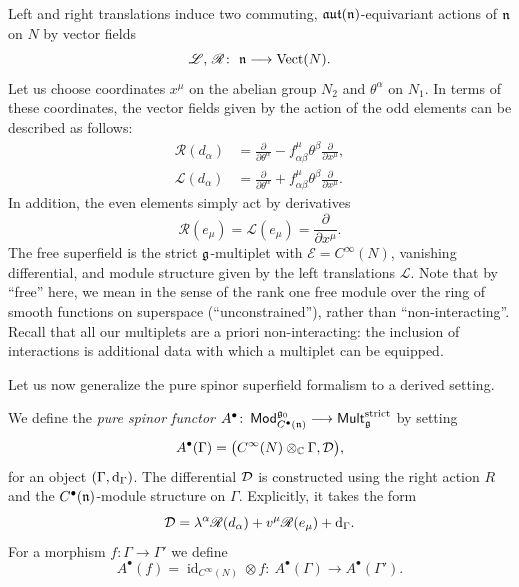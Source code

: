 \documentclass[pdftex]{sigma}
\numberwithin{equation}{section}
\def\cE{\mathcal E}\def\cF{\mathcal F}\def\cG{\mathcal G}\def\cH{\mathcal H}
\def\cat#1{\ensuremath{\mathsf{#1}}}
\DeclareMathOperator{\Mod}{\cat{Mod}}
\DeclareMathOperator{\Mult}{\cat{Mult}}
\def\lie#1{\ensuremath{\mathfrak{#1}}}
\def\aut{\ensuremath{\lie{aut}}}
\def\d{{\rm d}}
\DeclareMathOperator{\id}{id}
\DeclareMathOperator{\Vect}{Vect}
\def\sL{\mathscr L}
\def\sR{\mathscr R}
\begin{document}
Left and right translations induce two commuting, $\aut(\fn)$-equivariant actions of $\mathfrak n$ on $N$ by vector fields
\begin{equation*}
\sL,\, \sR \colon \ \fn \longrightarrow \Vect(N) .
\end{equation*}
Let us choose coordinates $x^\mu$ on the abelian group $N_2$
and $\theta^\alpha$ on $N_1$. In terms of these coordinates, the vector fields given by the action of the odd elements can be described as follows:
\begin{equation*}
\begin{split}
\sR(d_\alpha) &= \frac{\partial}{\partial \theta^\alpha} - f^\mu_{\alpha \beta} \theta^\beta \frac{\partial}{\partial x^\mu}, \\
\sL(d_\alpha) &= \frac{\partial}{\partial \theta^\alpha} + f^\mu_{\alpha \beta} \theta^\beta \frac{\partial}{\partial x^\mu}.
\end{split}
\end{equation*}
In addition, the even elements simply act by derivatives
\begin{equation*}
\sR(e_\mu) = \sL(e_\mu) = \frac{\partial}{\partial x^\mu}.
\end{equation*}
The free superfield is the strict $\mathfrak g$-multiplet with $\cE = C^\infty(N)$, vanishing differential, and module structure given by the left translations $\sL$. Note that by ``free'' here, we mean in the sense of the rank one free module over the ring of smooth functions on superspace (``unconstrained''), rather than ``non-interacting''. Recall that all our multiplets are a priori non-interacting: the inclusion of interactions is additional data with which a multiplet can be equipped.


Let us now generalize the pure spinor superfield formalism to a derived setting.
\begin{dfn}
	We define the \emph{pure spinor functor} $A^\bullet \colon \Mod_{C^\bullet(\fn)}^{\fg_0} \longrightarrow \Mult_{\fg}^{\mathrm{strict}}$ by setting
	\begin{equation*}
	A^\bullet(\Gamma) = \big(C^\infty(N) \otimes_\mathbb C \Gamma , \mathcal D\big) ,
	\end{equation*}
	for an object $(\Gamma , \d_\Gamma)$.
	The differential $\mathcal D$ is constructed using the right action $R$ and the $C^\bullet(\mathfrak n)$-module structure on $\Gamma$. Explicitly, it takes the form
	\begin{equation*}
	\cD = \lambda^\alpha \sR(d_\alpha) + v^\mu \sR(e_\mu) + \d_\Gamma .
	\end{equation*}
	For a morphism $f\colon\Gamma \longrightarrow \Gamma'$ we define
	\begin{equation*}
	A^\bullet(f) = \id_{C^\infty(N)} \otimes f \colon \ A^\bullet(\Gamma) \longrightarrow A^\bullet(\Gamma') .
	\end{equation*}
\end{dfn}
\end{document}
